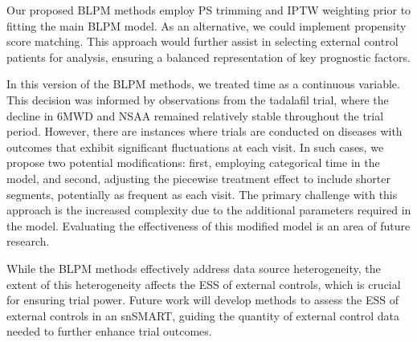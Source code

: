 Our proposed \ac{BLPM} methods employ \ac{PS} trimming and \ac{IPTW} weighting prior to fitting the main \ac{BLPM} model. As an alternative, we could implement propensity score matching. This approach would further assist in selecting external control patients for analysis, ensuring a balanced representation of key prognostic factors.

In this version of the \ac{BLPM} methods, we treated time as a continuous variable. This decision was informed by observations from the tadalafil trial, where the decline in \ac{6MWD} and \ac{NSAA} remained relatively stable throughout the trial period. However, there are instances where trials are conducted on diseases with outcomes that exhibit significant fluctuations at each visit. In such cases, we propose two potential modifications: first, employing categorical time in the model, and second, adjusting the piecewise treatment effect to include shorter segments, potentially as frequent as each visit. The primary challenge with this approach is the increased complexity due to the additional parameters required in the model. Evaluating the effectiveness of this modified model is an area of future research.

While the \ac{BLPM} methods effectively address data source heterogeneity, the extent of this heterogeneity affects the \ac{ESS} of external controls, which is crucial for ensuring trial power. Future work will develop methods to assess the \ac{ESS} of external controls in an \ac{snSMART}, guiding the quantity of external control data needed to further enhance trial outcomes.
